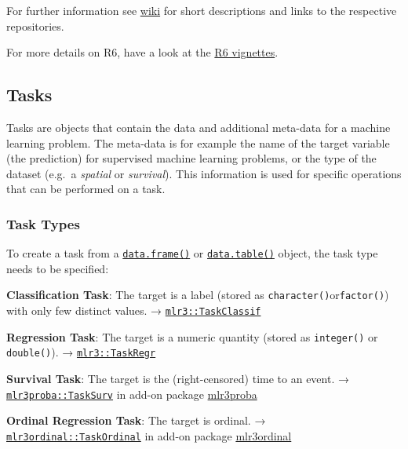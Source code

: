 \documentclass[]{article}
\begin{document}
For further information see \href{https://github.com/mlr-org/mlr3/wiki/Extension-Packages}{wiki} for short descriptions and links to the respective repositories.

For more details on R6, have a look at the \href{https://r6.r-lib.org/}{R6 vignettes}.

\hypertarget{tasks}{%
\subsection{Tasks}\label{tasks}}

Tasks are objects that contain the data and additional meta-data for a machine learning problem.
The meta-data is for example the name of the target variable (the prediction) for supervised machine learning problems, or the type of the dataset (e.g.~a \emph{spatial} or \emph{survival}).
This information is used for specific operations that can be performed on a task.

\hypertarget{tasks-types}{%
\subsubsection{Task Types}\label{tasks-types}}

To create a task from a \href{https://www.rdocumentation.org/packages/base/topics/data.frame}{\texttt{data.frame()}} or \href{https://www.rdocumentation.org/packages/data.table/topics/data.table-package}{\texttt{data.table()}} object, the task type needs to be specified:

\textbf{Classification Task}: The target is a label (stored as \texttt{character()}or\texttt{factor()}) with only few distinct values.
→ \href{https://mlr3.mlr-org.com/reference/TaskClassif.html}{\texttt{mlr3::TaskClassif}}

\textbf{Regression Task}: The target is a numeric quantity (stored as \texttt{integer()} or \texttt{double()}).
→ \href{https://mlr3.mlr-org.com/reference/TaskRegr.html}{\texttt{mlr3::TaskRegr}}

\textbf{Survival Task}: The target is the (right-censored) time to an event.
→ \href{https://mlr3proba.mlr-org.com/reference/TaskSurv.html}{\texttt{mlr3proba::TaskSurv}} in add-on package \href{https://mlr3proba.mlr-org.com}{mlr3proba}

\textbf{Ordinal Regression Task}: The target is ordinal.
→ \href{https://mlr3ordinal.mlr-org.com/reference/TaskOrdinal.html}{\texttt{mlr3ordinal::TaskOrdinal}} in add-on package \href{https://mlr3ordinal.mlr-org.com}{mlr3ordinal}
\end{document}
